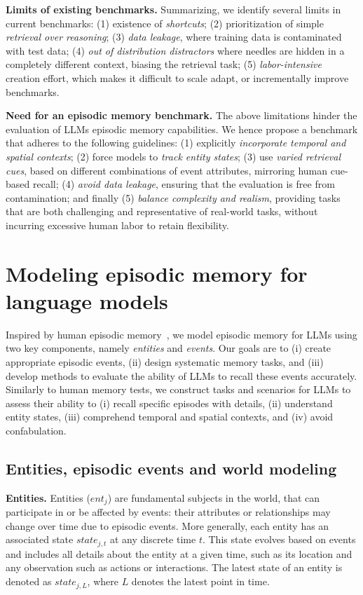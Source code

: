 \documentclass{article}
\begin{document}
\noindent \textbf{Limits of existing benchmarks.}
Summarizing, we identify several limits in current benchmarks: (1) existence of \textit{shortcuts};  (2) prioritization  of simple \textit{retrieval over reasoning}; (3) \textit{data leakage}, where training data is contaminated with test data; (4)  \textit{out of distribution distractors} where needles are hidden in a completely different context, biasing the retrieval task; (5) \textit{labor-intensive} creation effort, which makes it difficult to scale adapt, or incrementally improve benchmarks. %

\noindent \textbf{Need for an episodic memory benchmark.}
The above limitations hinder the evaluation of LLMs episodic memory capabilities. We hence propose a benchmark that adheres to the following guidelines: (1) explicitly \textit{incorporate temporal and spatial contexts}; (2) force models to \textit{track entity states}; 
(3) use \textit{varied retrieval cues}, based on different combinations of event attributes, mirroring human cue-based recall; (4) \textit{avoid data leakage}, ensuring that the evaluation is free from contamination; and finally (5) \textit{balance complexity and realism}, providing tasks that are both challenging and representative of real-world tasks, without incurring excessive human labor to retain flexibility. 

\section{Modeling episodic memory for language models}\label{sec:model}
Inspired by human episodic memory~\citep{Tulving1972}, we model episodic memory for LLMs using two key components, namely \textit{entities} and \textit{events}. Our goals are to (i) create appropriate episodic events, (ii) design systematic memory tasks, and (iii) develop methods to evaluate the ability of LLMs to recall these events accurately. 
Similarly to human memory tests, we construct tasks and scenarios for LLMs to assess their ability to (i) recall specific episodes with details, (ii) understand entity states, (iii) comprehend temporal and spatial contexts, and (iv) avoid confabulation.

\subsection{Entities, episodic events and world modeling}
\noindent \textbf{Entities.} Entities ($ent_j$) are fundamental subjects in the world, that can participate in or be affected by events: their attributes or relationships may change over time due to episodic events. More generally, 
each entity has an associated state \( state_{j,t} \) at any discrete time \( t \). This state evolves based on events
and includes all details about the entity at a given time, such as its location and any observation such as actions or interactions. The latest state of an entity is denoted as \( state_{j,L} \), where \( L \) denotes the latest point in time.
\end{document}
